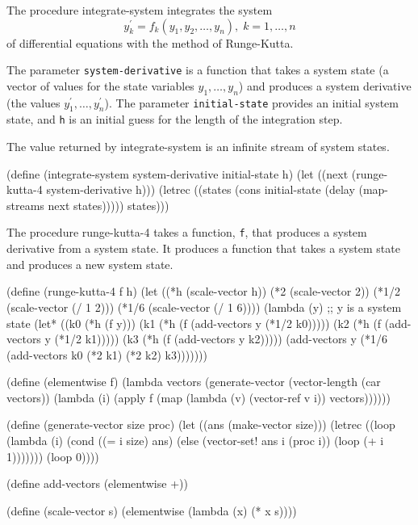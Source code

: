 

The procedure {\cf integrate-system} integrates the system
$$y_k^\prime = f_k(y_1, y_2, \ldots, y_n), \; k = 1, \ldots, n$$
of differential equations with the method of Runge-Kutta.

The parameter {\tt system-derivative} is a function that takes a system
state (a vector of values for the state variables $y_1, \ldots, y_n$)
and produces a system derivative (the values $y_1^\prime, \ldots,
y_n^\prime$).  The parameter {\tt initial-state} provides an initial
system state, and {\tt h} is an initial guess for the length of the
integration step.

The value returned by {\cf integrate-system} is an infinite stream of
system states.

\begin{schemenoindent}
(define (integrate-system system-derivative
                          initial-state
                          h)
  (let ((next (runge-kutta-4 system-derivative h)))
    (letrec ((states
              (cons initial-state
                    (delay (map-streams next
                                        states)))))
      states)))
\end{schemenoindent}

The procedure {\cf runge-kutta-4} takes a function, {\tt f}, that produces a
system derivative from a system state.  It
produces a function that takes a system state and
produces a new system state.

\begin{schemenoindent}
(define (runge-kutta-4 f h)
  (let ((*h (scale-vector h))
        (*2 (scale-vector 2))
        (*1/2 (scale-vector (/ 1 2)))
        (*1/6 (scale-vector (/ 1 6))))
    (lambda (y)
      ;; y is a system state
      (let* ((k0 (*h (f y)))
             (k1 (*h (f (add-vectors y (*1/2 k0)))))
             (k2 (*h (f (add-vectors y (*1/2 k1)))))
             (k3 (*h (f (add-vectors y k2)))))
        (add-vectors y
          (*1/6 (add-vectors k0
                             (*2 k1)
                             (*2 k2)
                             k3)))))))

(define (elementwise f)
  (lambda vectors
    (generate-vector
     (vector-length (car vectors))
     (lambda (i)
       (apply f
              (map (lambda (v) (vector-ref  v i))
                   vectors))))))

(define (generate-vector size proc)
  (let ((ans (make-vector size)))
    (letrec ((loop
              (lambda (i)
                (cond ((= i size) ans)
                      (else
                       (vector-set! ans i (proc i))
                       (loop (+ i 1)))))))
      (loop 0))))

(define add-vectors (elementwise +))

(define (scale-vector s)
  (elementwise (lambda (x) (* x s))))
\end{schemenoindent}

